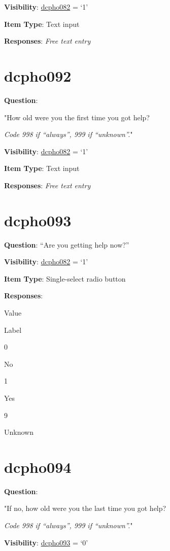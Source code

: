 \documentclass[]{book}
\begin{document}
\textbf{Visibility}: \protect\hyperlink{dcpho082}{dcpho082} = `1'

\textbf{Item Type}: Text input

\textbf{Responses}: \emph{Free text entry}

\hypertarget{dcpho092}{%
\section{dcpho092}\label{dcpho092}}

\textbf{Question}:

"How old were you the first time you got help?

\emph{Code 998 if ``always'', 999 if ``unknown''.}"

\textbf{Visibility}: \protect\hyperlink{dcpho082}{dcpho082} = `1'

\textbf{Item Type}: Text input

\textbf{Responses}: \emph{Free text entry}

\hypertarget{dcpho093}{%
\section{dcpho093}\label{dcpho093}}

\textbf{Question}: ``Are you getting help now?''

\textbf{Visibility}: \protect\hyperlink{dcpho082}{dcpho082} = `1'

\textbf{Item Type}: Single-select radio button

\textbf{Responses}:

Value

Label

0

No

1

Yes

9

Unknown

\hypertarget{dcpho094}{%
\section{dcpho094}\label{dcpho094}}

\textbf{Question}:

"If no, how old were you the last time you got help?

\emph{Code 998 if ``always'', 999 if ``unknown''.}"

\textbf{Visibility}: \protect\hyperlink{dcpho093}{dcpho093} = `0'
\end{document}
